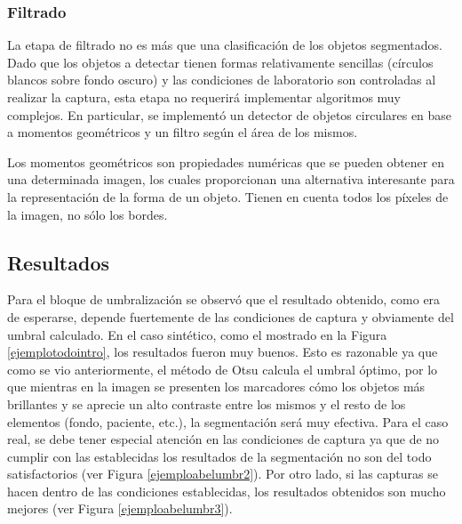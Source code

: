 \subsubsection{Filtrado}
 La etapa de filtrado no es más que una clasificación de los objetos segmentados. Dado que los objetos a detectar tienen formas relativamente sencillas (círculos blancos sobre fondo oscuro) y las condiciones de laboratorio son controladas al realizar la captura, esta etapa no requerirá implementar algoritmos muy complejos. En particular, se implementó un detector de objetos circulares en base a momentos geométricos\cite{imageMoments} y un filtro según el área de los mismos.

 Los momentos geométricos son propiedades numéricas que se pueden obtener en una determinada imagen, los cuales proporcionan una alternativa interesante para la representación de la forma de un objeto. Tienen en cuenta todos los píxeles de la imagen, no sólo los bordes.

 \subsection{Resultados}
 Para el bloque de umbralización se observó que el resultado obtenido, como era de esperarse, depende fuertemente de las condiciones de captura y obviamente del umbral calculado. En el caso sintético, como el mostrado en la Figura \ref{ejemplotodointro}, los resultados fueron muy buenos. Esto es razonable ya que como se vio anteriormente, el método de Otsu calcula el umbral óptimo, por lo que mientras en la imagen se presenten los marcadores cómo los objetos más brillantes y se aprecie un alto contraste entre los mismos y el resto de los elementos (fondo, paciente, etc.), la segmentación será muy efectiva. Para el caso real, se debe tener especial atención en las condiciones de captura ya que de no cumplir con las establecidas los resultados de la segmentación no son del todo satisfactorios (ver Figura \ref{ejemploabelumbr2}). Por otro lado, si las capturas se hacen dentro de las condiciones establecidas, los resultados obtenidos son mucho mejores (ver Figura \ref{ejemploabelumbr3}).

